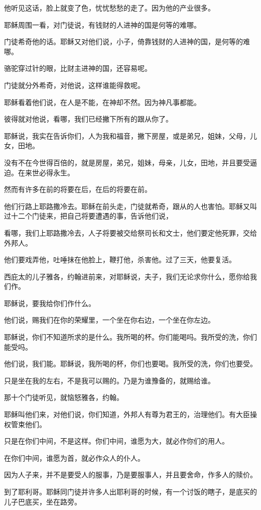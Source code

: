 \documentclass[12pt,oneside]{book}
\begin{document}
他听见这话，脸上就变了色，忧忧愁愁的走了。因为他的产业很多。

耶稣周围一看，对门徒说，有钱财的人进神的国是何等的难哪。

门徒希奇他的话。耶稣又对他们说，小子，倚靠钱财的人进神的国，是何等的难哪。

骆驼穿过针的眼，比财主进神的国，还容易呢。

门徒就分外希奇，对他说，这样谁能得救呢。

耶稣看着他们说，在人是不能，在神却不然。因为神凡事都能。

彼得就对他说，看哪，我们已经撇下所有的跟从你了。

耶稣说，我实在告诉你们，人为我和福音，撇下房屋，或是弟兄，姐妹，父母，儿女，田地。

没有不在今世得百倍的，就是房屋，弟兄，姐妹，母亲，儿女，田地，并且要受逼迫。在来世必得永生。

然而有许多在前的将要在后，在后的将要在前。

他们行路上耶路撒冷去。耶稣在前头走，门徒就希奇，跟从的人也害怕。耶稣又叫过十二个门徒来，把自己将要遭遇的事，告诉他们说，

看哪，我们上耶路撒冷去，人子将要被交给祭司长和文士，他们要定他死罪，交给外邦人。

他们要戏弄他，吐唾抹在他脸上，鞭打他，杀害他。过了三天，他要复活。

西庇太的儿子雅各，约翰进前来，对耶稣说，夫子，我们无论求你什么，愿你给我们作。

耶稣说，要我给你们作什么。

他们说，赐我们在你的荣耀里，一个坐在你右边，一个坐在你左边。

耶稣说，你们不知道所求的是什么。我所喝的杯。你们能喝吗。我所受的洗，你们能受吗。

他们说，我们能。耶稣说，我所喝的杯，你们也要喝。我所受的洗，你们也要受。

只是坐在我的左右，不是我可以赐的。乃是为谁豫备的，就赐给谁。

那十个门徒听见，就恼怒雅各，约翰。

耶稣叫他们来，对他们说，你们知道，外邦人有尊为君王的，治理他们。有大臣操权管束他们。

只是在你们中间，不是这样。你们中间，谁愿为大，就必作你们的用人。

在你们中间，谁愿为首，就必作众人的仆人。

因为人子来，并不是要受人的服事，乃是要服事人，并且要舍命，作多人的赎价。

到了耶利哥。耶稣同门徒并许多人出耶利哥的时候，有一个讨饭的瞎子，是底买的儿子巴底买，坐在路旁。
\end{document}
